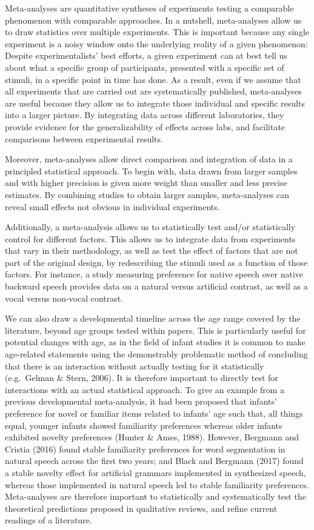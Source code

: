 \documentclass[man]{apa6}
\begin{document}
Meta-analyses are quantitative syntheses of experiments testing a comparable phenomenon with comparable approaches. In a nutshell, meta-analyses allow us to draw statistics over multiple experiments. This is important because any single experiment is a noisy window onto the underlying reality of a given phenomenon: Despite experimentalists' best efforts, a given experiment can at best tell us about what a specific group of participants, presented with a specific set of stimuli, in a specific point in time has done. As a result, even if we assume that all experiments that are carried out are systematically published, meta-analyses are useful because they allow us to integrate those individual and specific results into a larger picture. By integrating data across different laboratories, they provide evidence for the generalizability of effects across labs, and facilitate comparisons between experimental results.

Moreover, meta-analyses allow direct comparison and integration of data in a principled statistical approach. To begin with, data drawn from larger samples and with higher precision is given more weight than smaller and less precise estimates. By combining studies to obtain larger samples, meta-analyses can reveal small effects not obvious in individual experiments.

Additionally, a meta-analysis allows us to statistically test and/or statistically control for different factors. This allows us to integrate data from experiments that vary in their methodology, as well as test the effect of factors that are not part of the original design, by redescribing the stimuli used as a function of those factors. For instance, a study measuring preference for native speech over native backward speech provides data on a natural versus artificial contrast, as well as a vocal versus non-vocal contrast.

We can also draw a developmental timeline across the age range covered by the literature, beyond age groups tested within papers. This is particularly useful for potential changes with age, as in the field of infant studies it is common to make age-related statements using the demonstrably problematic method of concluding that there is an interaction without actually testing for it statistically (e.g.~Gelman \& Stern, 2006). It is therefore important to directly test for interactions with an actual statistical approach. To give an example from a previous developmental meta-analysis, it had been proposed that infants' preference for novel or familiar items related to infants' age such that, all things equal, younger infants showed familiarity preferences whereas older infants exhibited novelty preferences (Hunter \& Ames, 1988). However, Bergmann and Cristia (2016) found stable familiarity preferences for word segmentation in natural speech across the first two years; and Black and Bergmann (2017) found a stable novelty effect for artificial grammars implemented in synthesized speech, whereas those implemented in natural speech led to stable familiarity preferences. Meta-analyses are therefore important to statistically and systematically test the theoretical predictions proposed in qualitative reviews, and refine current readings of a literature.
\end{document}

